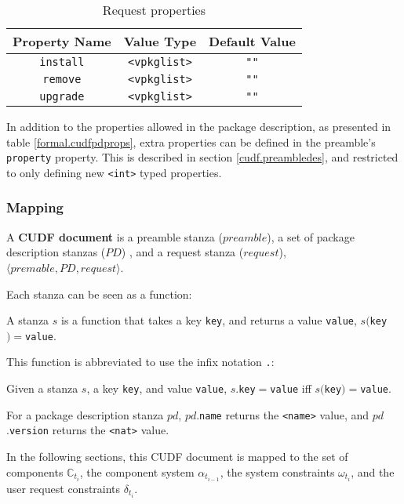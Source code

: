 \begin{table}
\begin{tabular}{|c|c|c|}
Property Name & Value Type & Default Value \\ \hline
\texttt{install} & \verb+<vpkglist>+ & \verb+""+ \\ 
\texttt{remove} & \verb+<vpkglist>+ & \verb+""+ \\ 
\texttt{upgrade} & \verb+<vpkglist>+ & \verb+""+ \\ 
\end{tabular}
\caption{Request properties}
\label{formal.cudfrequestprops}
\end{table}

In addition to the properties allowed in the package description, as presented in table \ref{formal.cudfpdprops}, extra properties can be defined in the preamble's \texttt{property} property.
This is described in section \ref{cudf.preambledes}, and restricted to only defining new \texttt{<int>} typed properties.

\subsubsection{Mapping}

\begin{defs}
A \textbf{CUDF document} is a preamble stanza ($preamble$), a set of package description stanzas ($PD$) , and a request stanza ($request$), $\langle premable, PD, request \rangle$.
\end{defs}

Each stanza can be seen as a function:
\begin{defs}
A stanza $s$ is a function that takes a key \texttt{key}, and returns a value \texttt{value}, $s($\texttt{key}$) = $\texttt{value}. 
\end{defs}

This function is abbreviated to use the infix notation \texttt{.}:
\begin{defs}
Given a stanza $s$, a key \texttt{key}, and value \texttt{value}, $s$.\texttt{key}$ = $\texttt{value} iff $s($\texttt{key}$) = $\texttt{value}.
\end{defs}
For a package description stanza $pd$, $pd$.\texttt{name} returns the \texttt{<name>} value,
and $pd$.\texttt{version} returns the \texttt{<nat>} value.

In the following sections, this CUDF document is mapped to the set of components $\mathbb{C}_{t_i}$, the component system $\alpha_{t_{i-1}}$,
the system constraints $\omega_{t_i}$, and the user request constraints $\delta_{t_i}$.

